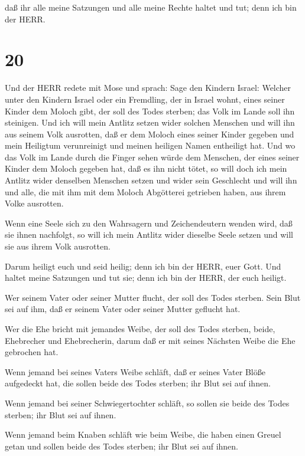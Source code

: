  daß ihr alle meine Satzungen und alle meine Rechte haltet
und tut; denn ich bin der HERR.

\hypertarget{section-19}{%
\section{20}\label{section-19}}

 Und der HERR redete mit Mose und sprach:  Sage
den Kindern Israel: Welcher unter den Kindern Israel oder ein Fremdling,
der in Israel wohnt, eines seiner Kinder dem Moloch gibt, der soll des
Todes sterben; das Volk im Lande soll ihn steinigen.  Und
ich will mein Antlitz setzen wider solchen Menschen und will ihn aus
seinem Volk ausrotten, daß er dem Moloch eines seiner Kinder gegeben und
mein Heiligtum verunreinigt und meinen heiligen Namen entheiligt hat.
 Und wo das Volk im Lande durch die Finger sehen würde dem
Menschen, der eines seiner Kinder dem Moloch gegeben hat, daß es ihn
nicht tötet,  so will doch ich mein Antlitz wider denselben
Menschen setzen und wider sein Geschlecht und will ihn und alle, die mit
ihm mit dem Moloch Abgötterei getrieben haben, aus ihrem Volke
ausrotten.

 Wenn eine Seele sich zu den Wahrsagern und Zeichendeutern
wenden wird, daß sie ihnen nachfolgt, so will ich mein Antlitz wider
dieselbe Seele setzen und will sie aus ihrem Volk ausrotten.

 Darum heiligt euch und seid heilig; denn ich bin der HERR,
euer Gott.  Und haltet meine Satzungen und tut sie; denn ich
bin der HERR, der euch heiligt.

 Wer seinem Vater oder seiner Mutter flucht, der soll des
Todes sterben. Sein Blut sei auf ihm, daß er seinem Vater oder seiner
Mutter geflucht hat.

 Wer die Ehe bricht mit jemandes Weibe, der soll des Todes
sterben, beide, Ehebrecher und Ehebrecherin, darum daß er mit seines
Nächsten Weibe die Ehe gebrochen hat.

 Wenn jemand bei seines Vaters Weibe schläft, daß er seines
Vater Blöße aufgedeckt hat, die sollen beide des Todes sterben; ihr Blut
sei auf ihnen.

 Wenn jemand bei seiner Schwiegertochter schläft, so sollen
sie beide des Todes sterben; ihr Blut sei auf ihnen.

 Wenn jemand beim Knaben schläft wie beim Weibe, die haben
einen Greuel getan und sollen beide des Todes sterben; ihr Blut sei auf
ihnen.

